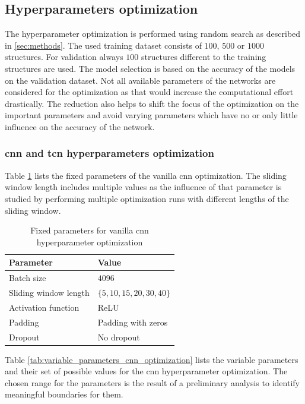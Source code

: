\documentclass[conference]{IEEEtran}
\begin{document}

\noindent
\subsection{Hyperparameters optimization}

The hyperparameter optimization is performed using random search as described in \ref{sec:methods}. The used training dataset consists of $ 100 $, $ 500 $ or $ 1000 $ structures. For validation always $ 100 $ structures different to the training structures are used. The model selection is based on the accuracy of the models on the validation dataset. Not all available parameters of the networks are considered for the optimization as that would increase the computational effort drastically. The reduction also helps to shift the focus of the optimization on the important parameters and avoid varying parameters which have no or only little influence on the accuracy of the network.

\subsubsection{\gls{cnn} and \gls{tcn} hyperparameters optimization}
Table \ref{tab:fixed_parameters_cnn_optimization} lists the fixed parameters of the vanilla \gls{cnn} optimization. The sliding window length includes multiple values as the influence of that parameter is studied by performing multiple optimization runs with different lengths of the sliding window.

\begin{table}[htp]
	\centering
	\caption{Fixed parameters for vanilla \gls{cnn} hyperparameter optimization}
	\label{tab:fixed_parameters_cnn_optimization}
	\begin{tabular}{ll}
		\textbf{Parameter} & \textbf{Value} \\
		\hline
		Batch size & $ 4096 $ \\
		Sliding window length & $ \{5, 10, 15, 20, 30, 40\} $ \\
		Activation function & ReLU \\
		Padding & Padding with zeros \\
		Dropout & No dropout
	\end{tabular}
\end{table}

Table \ref{tab:variable_parameters_cnn_optimization} lists the variable parameters and their set of possible values for the \gls{cnn} hyperparameter optimization. The chosen range for the parameters is the result of a preliminary analysis to identify meaningful boundaries for them.
\end{document}
